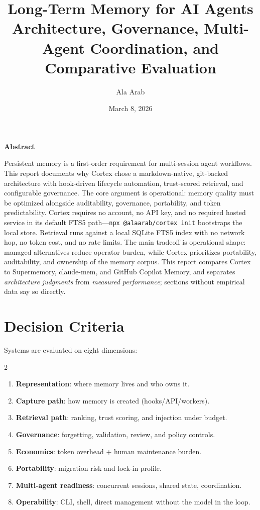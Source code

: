 \documentclass[10pt]{article}
\title{\vspace{-0.8em}Long-Term Memory for AI Agents\\[2pt]
\large Architecture, Governance, Multi-Agent Coordination, and Comparative Evaluation}
\author{Ala Arab}
\date{March 8, 2026}
\renewenvironment{abstract}{%
  \begin{center}\textbf{Abstract}\end{center}\small\noindent%
}{\par\medskip}
\begin{document}
\maketitle\vspace{-0.5em}

\begin{abstract}
\noindent Persistent memory is a first-order requirement for multi-session agent workflows. This report documents why Cortex chose a markdown-native, git-backed architecture with hook-driven lifecycle automation, trust-scored retrieval, and configurable governance. The core argument is operational: memory quality must be optimized alongside auditability, governance, portability, and token predictability. Cortex requires no account, no API key, and no required hosted service in its default FTS5 path---\texttt{npx @alaarab/cortex init} bootstraps the local store. Retrieval runs against a local SQLite FTS5 index with no network hop, no token cost, and no rate limits. The main tradeoff is operational shape: managed alternatives reduce operator burden, while Cortex prioritizes portability, auditability, and ownership of the memory corpus. This report compares Cortex to Supermemory, claude-mem, and GitHub Copilot Memory, and separates \textit{architecture judgments} from \textit{measured performance}; sections without empirical data say so directly.
\end{abstract}

\vspace{0.4em}
\section{Decision Criteria}
\label{sec:criteria}
Systems are evaluated on eight dimensions:
\begin{multicols}{2}
\begin{enumerate}
  \item \textbf{Representation}: where memory lives and who owns it.
  \item \textbf{Capture path}: how memory is created (hooks/API/workers).
  \item \textbf{Retrieval path}: ranking, trust scoring, and injection under budget.
  \item \textbf{Governance}: forgetting, validation, review, and policy controls.
  \item \textbf{Economics}: token overhead + human maintenance burden.
  \item \textbf{Portability}: migration risk and lock-in profile.
  \item \textbf{Multi-agent readiness}: concurrent sessions, shared state, coordination.
  \item \textbf{Operability}: CLI, shell, direct management without the model in the loop.
\end{enumerate}
\end{multicols}
\end{document}
